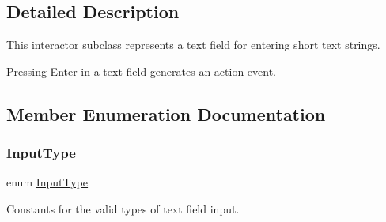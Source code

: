 \subsection{Detailed Description}
This interactor subclass represents a text field for entering short text strings. 

Pressing Enter in a text field generates an action event. 

\subsection{Member Enumeration Documentation}
\mbox{\label{classsgl_1_1GTextField_a5fc772c800c3d40d2b95564e8a839bab}} 
\subsubsection{\texorpdfstring{Input\+Type}{InputType}}
{\footnotesize\ttfamily enum \mbox{\hyperlink{classsgl_1_1GTextField_a5fc772c800c3d40d2b95564e8a839bab}{Input\+Type}}}



Constants for the valid types of text field input. 

